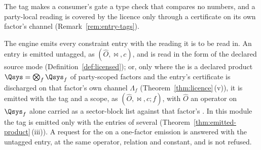 
The tag makes a consumer's gate a type check that compares no numbers, and a
party-local reading is covered by the licence only through a certificate on
its own factor's channel (Remark~\ref{rem:entry-tags}).

\begin{requirement}\label{req:party-local-tag}
The engine emits every constraint entry with the reading it is to be read in.
An entry is emitted untagged, as $(\hat O,\bowtie,c)$, and is read in the
form of the declared source mode (Definition~\ref{def:licensed}); or, only
where the  is a declared product
$\Qsys=\bigotimes_f\Qsys_f$ of party-scoped factors and the entry's
certificate is discharged on that factor's own channel $\Lambda_f$
(Theorem~\ref{thm:licence}\,(v)), it is emitted with the tag
 and a scope, as $(\hat O,\bowtie,c;f)$, with $\hat O$ an
operator on $\Qsys_f$ alone carried as a sector-block list against that
factor's . In this module the tag is emitted only with the
entries of several 
(Theorem~\ref{thm:emitted-product}\,(iii)).
A request for the  on a one-factor emission is answered
with the untagged entry, at the same operator, relation and constant, and is
not refused.
\end{requirement}
